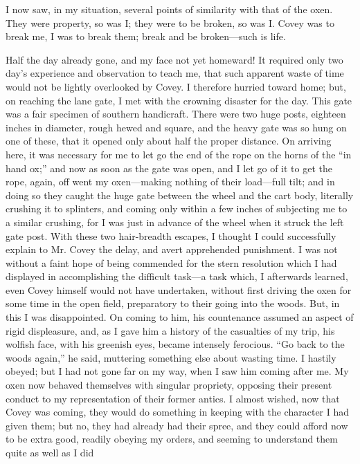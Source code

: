 I now saw, in my situation, several points of similarity with that of
the oxen. They were property, so was I; they were to be broken, so was
I. Covey was to break me, I was to break them; break and be
broken---such is life.

Half the day already gone, and my face not yet homeward! It required
only two day's experience and observation to teach me, that such
apparent waste of time would not be lightly overlooked by Covey. I
therefore hurried toward home; but, on reaching the lane gate, I met
with the crowning disaster for the day. This gate was a fair specimen of
southern handicraft. There were two huge posts, eighteen inches in
diameter, rough hewed and square, and the heavy gate was so hung on one
of these, that it opened only about half the proper distance. On
{}arriving here, it was necessary for me to let go the end of the rope
on the horns of the ``in hand ox;'' and now as soon as the gate was
open, and I let go of it to get the rope, again, off went my
oxen---making nothing of their load---full tilt; and in doing so they
caught the huge gate between the wheel and the cart body, literally
crushing it to splinters, and coming only within a few inches of
subjecting me to a similar crushing, for I was just in advance of the
wheel when it struck the left gate post. With these two hair-breadth
escapes, I thought I could successfully explain to Mr. Covey the delay,
and avert apprehended punishment. I was not without a faint hope of
being commended for the stern resolution which I had displayed in
accomplishing the difficult task---a task which, I afterwards learned,
even Covey himself would not have undertaken, without first driving the
oxen for some time in the open field, preparatory to their going into
the woods. But, in this I was disappointed. On coming to him, his
countenance assumed an aspect of rigid displeasure, and, as I gave him a
history of the casualties of my trip, his wolfish face, with his
greenish eyes, became intensely ferocious. ``Go back to the woods
again,'' he said, muttering something else about wasting time. I hastily
obeyed; but I had not gone far on my way, when I saw him coming after
me. My oxen now behaved themselves with singular propriety, opposing
their present conduct to my representation of their former antics. I
almost wished, now that Covey was coming, they would do something in
keeping with the character I had given them; but no, they had already
{}had their spree, and they could afford now to be extra good, readily
obeying my orders, and seeming to understand them quite as well as I did
